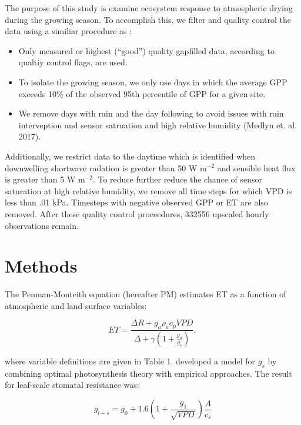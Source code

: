 \documentclass[draft,linenumbers]{agujournal}
\begin{document}
The purpose of this study is examine ecosystem response to atmospheric drying during the growing season. To accomplish this, we filter and quality control the data using a similiar procedure as \cite{Zhou_2015}:
\begin{itemize}
\item Only measured or highest (``good'') quality gapfilled data, according to qualtiy control flags, are used.
\item To isolate the growing season, we only use days in which the average GPP exceeds 10\% of the observed 95th percentile of GPP for a given site.
\item We remove days with rain and the day following to avoid issues with rain interveption and sensor satruation and high relative humidity (Medlyn et. al. 2017).
\end{itemize}
Additionally, we restrict data to the daytime which is identified when downwelling shortwave radation is greater than 50 W m$^{-2}$ and sensible heat flux is greater than 5 W m$^{-2}$. To reduce further reduce the chance of sensor saturation at high relative humidity, we remove all time steps for which VPD is less than .01 kPa. Timesteps with negative observed GPP or ET are also removed. After these quality control proceedures, 332556 upscaled hourly observations remain.

\section{Methods}
The Penman-Monteith equation (hereafter PM) estimates ET as a function of atmospheric and land-surface variables:
\begin{linenomath*}
  \begin{equation}
      ET = \frac{\Delta R + g_a \rho_a c_p VPD}{\Delta + \gamma(1 + \frac{g_a}{g_s})},
  \end{equation}
\end{linenomath*}

 where variable definitions are given in Table 1. \citet{MEDLYN_2011} developed a model for $g_s$ by combining optimal photosynthesis theory with empirical approaches. The result for leaf-scale stomatal resistance was:

\begin{linenomath*}
  \begin{equation}
  g_{l-s} = g_0 + 1.6 \left(1 + \frac{g_1}{\sqrt{VPD}}\right) \frac{A}{c_s}
  \end{equation}
\end{linenomath*}
\end{document}
